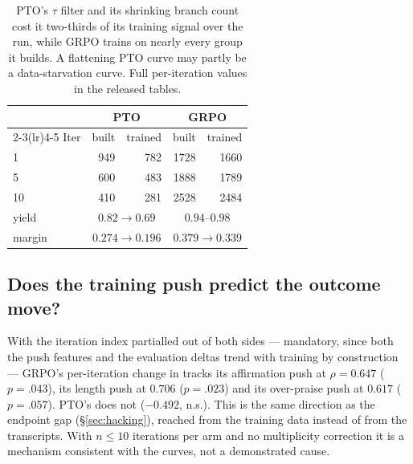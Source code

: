 \begin{table}[h]
  \centering\small
  \begin{tabular}{@{}lrrrr@{}}
    \toprule
    & \multicolumn{2}{c}{PTO} & \multicolumn{2}{c}{GRPO}\\
    \cmidrule(lr){2-3}\cmidrule(lr){4-5}
    Iter & built & trained & built & trained\\
    \midrule
    1  & 949 & 782 & 1728 & 1660\\
    5  & 600 & 483 & 1888 & 1789\\
    10 & 410 & 281 & 2528 & 2484\\
    \midrule
    yield & \multicolumn{2}{c}{$0.82 \to 0.69$} & \multicolumn{2}{c}{$0.94$--$0.98$}\\
    margin & \multicolumn{2}{c}{$0.274 \to 0.196$} & \multicolumn{2}{c}{$0.379 \to 0.339$}\\
    \bottomrule
  \end{tabular}
  \caption{PTO's $\tau$ filter and its shrinking branch count cost it two-thirds of its
  training signal over the run, while GRPO trains on nearly every group it builds. A
  flattening PTO curve may partly be a data-starvation curve. Full per-iteration values in
  the released tables.}
  \label{tab:yield}
\end{table}

\subsection{Does the training push predict the outcome move?}

With the iteration index partialled out of both sides --- mandatory, since both the push
features and the evaluation deltas trend with training by construction --- GRPO's
per-iteration change in \mici{} tracks its affirmation push at $\rho = 0.647$ ($p = .043$),
its length push at $0.706$ ($p = .023$) and its over-praise push at $0.617$ ($p = .057$).
PTO's does not ($-0.492$, n.s.). This is the same direction as the endpoint \mici{} gap
(\S\ref{sec:hacking}), reached from the training data instead of from the transcripts. With
$n \le 10$ iterations per arm and no multiplicity correction it is a mechanism consistent
with the curves, not a demonstrated cause.
